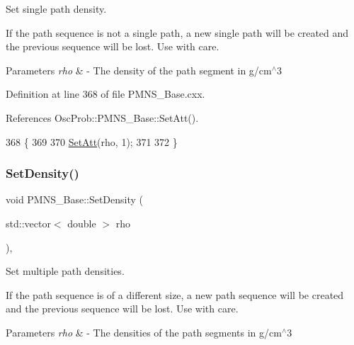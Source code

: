 Set single path density.

If the path sequence is not a single path, a new single path will be created and the previous sequence will be lost. Use with care.


\begin{DoxyParams}{Parameters}
{\em rho} & -\/ The density of the path segment in g/cm$^\wedge$3 \\
\hline
\end{DoxyParams}


Definition at line 368 of file P\+M\+N\+S\+\_\+\+Base.\+cxx.



References Osc\+Prob\+::\+P\+M\+N\+S\+\_\+\+Base\+::\+Set\+Att().


\begin{DoxyCode}
368                                     \{
369 
370   \hyperlink{classOscProb_1_1PMNS__Base_aba565962a440d14bee7a2a96d2eca2c5}{SetAtt}(rho, 1);
371 
372 \}
\end{DoxyCode}
\mbox{\label{classOscProb_1_1PMNS__Base_a858221d5510fe732dc6a101fd305cda0}} 
\subsubsection{\texorpdfstring{Set\+Density()}{SetDensity()}\hspace{0.1cm}{\footnotesize\ttfamily [2/2]}}
{\footnotesize\ttfamily void P\+M\+N\+S\+\_\+\+Base\+::\+Set\+Density (\begin{DoxyParamCaption}\item[{std\+::vector$<$ double $>$}]{rho }\end{DoxyParamCaption})\hspace{0.3cm}{\ttfamily [virtual]}, {\ttfamily [inherited]}}

Set multiple path densities.

If the path sequence is of a different size, a new path sequence will be created and the previous sequence will be lost. Use with care.


\begin{DoxyParams}{Parameters}
{\em rho} & -\/ The densities of the path segments in g/cm$^\wedge$3 \\
\hline
\end{DoxyParams}


